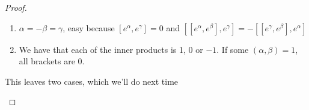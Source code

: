 \begin{proof}
\begin{enumerate}
\begin{enumerate}
       \item $\alpha=-\beta=\gamma$, easy because $[e^\alpha,e^\gamma]=0$ and
       $[[e^\alpha,e^\beta],e^\gamma] = -[ [e^\gamma,e^\beta],e^\alpha] $

       \item We have that each of the inner products is 1, 0 or $-1$. If some
        $(\alpha,\beta)=1$, all brackets are 0.
     \end{enumerate}
     This leaves two cases, which we'll do next time
   \end{enumerate}

 \end{proof}
